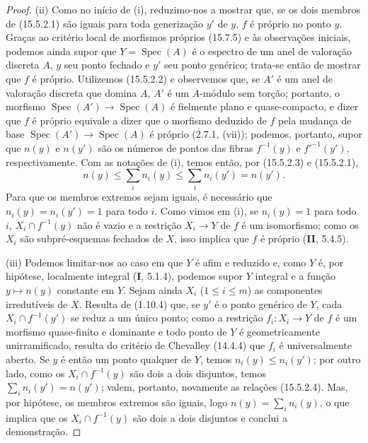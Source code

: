 \begin{proof}
(ii) Como no início de (i), reduzimo-nos a mostrar que, se os dois membros de (15.5.2.1) são iguais para toda generização $y'$ de $y$, $f$ é próprio no ponto $y$. Graças ao critério local de morfismos próprios (15.7.5) e às observações iniciais, podemos ainda supor que $Y=\operatorname{Spec}(A)$ é o espectro de um anel de valoração discreta $A$, $y$ seu ponto fechado e $y'$ seu ponto genérico; trata-se então de mostrar que $f$ é próprio. Utilizemos (15.5.2.2) e observemos que, se $A'$ é um anel de valoração discreta que domina $A$, $A'$ é um $A$-módulo sem torção; portanto, o morfismo $\operatorname{Spec}(A')\to\operatorname{Spec}(A)$ é fielmente plano e quase-compacto, e dizer que $f$ é próprio equivale a dizer que o morfismo deduzido de $f$ pela mudança de base $\operatorname{Spec}(A')\to\operatorname{Spec}(A)$ é
próprio (2.7.1, (vii)); podemos, portanto, supor que $n(y)$ e $n(y')$ são os números de pontos das fibras $f^{-1}(y)$ e $f'^{-1}(y')$, respectivamente. Com as notações de (i), temos então, por (15.5.2.3) e (15.5.2.1),
\begin{equation}
\tag{15.5.2.4}
\label{IV.15.5.2.4}
  n(y)\leqslant\sum_i n_i(y)\leqslant\sum_i n_i(y')=n(y').
\end{equation}
Para que os membros extremos sejam iguais, é necessário que $n_i(y)=n_i(y')=1$ para todo $i$. Como vimos em (i), se $n_i(y)=1$ para todo $i$, $X_i\cap f^{-1}(y)$ não é vazio e a restrição $X_i\to Y$ de $f$ é um isomorfismo; como os $X_i$ são subpré-esquemas fechados de $X$, isso implica que $f$ é próprio (\textbf{II}, 5.4.5).

(iii) Podemos limitar-nos ao caso em que $Y$ é afim e reduzido e, como $Y$ é, por hipótese, localmente integral (\textbf{I}, 5.1.4), podemos supor $Y$ integral e a função $y\mapsto n(y)$ constante em $Y$. Sejam ainda $X_i$ ($1\leqslant i\leqslant m$) as componentes irredutíveis de $X$. Resulta de (1.10.4) que, se $y'$ é o ponto genérico de $Y$, cada $X_i\cap f^{-1}(y')$ se reduz a um único ponto; como a restrição $f_i:X_i\to Y$ de $f$ é um morfismo quase-finito e dominante e todo ponto de $Y$ é geometricamente unirramificado, resulta do critério de Chevalley (14.4.4) que $f_i$ é universalmente aberto. Se $y$ é então um ponto qualquer de $Y$, temos $n_i(y)\leqslant n_i(y')$; por outro lado, como os $X_i\cap f^{-1}(y)$ são dois a dois disjuntos, temos $\sum_i n_i(y')=n(y')$; valem, portanto, novamente as relações (15.5.2.4). Mas, por hipótese, os membros extremos são iguais, logo $n(y)=\sum_i n_i(y)$, o que implica que os $X_i\cap f^{-1}(y)$ são dois a dois disjuntos e conclui a demonstração.
\end{proof}

